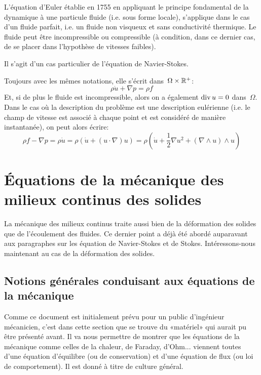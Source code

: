 L'équation d'Euler établie en 1755 en appliquant le principe fondamental de la dynamique à une particule fluide (i.e. sous forme locale), s'applique dans le cas d'un fluide parfait, i.e. un fluide non visqueux et sans conductivité thermique. Le fluide peut être incompressible ou compressible (à condition, dans ce dernier cas, de se placer dans l'hypothèse de vitesses faibles). 

Il s'agit d'un cas particulier de l'équation de Navier-Stokes.

\medskip
Toujours avec les mêmes notations, elle s'écrit dans~$\Omega\times\mathbb R^+$:
\begin{equation}
\rho \dot{u} + \nabla p = \rho f
\end{equation}
Et, si de plus le fluide est incompressible, alors on a également 
$\operatorname{div} u = 0$ dans~$\Omega$.
\medskipvm{}
Dans le cas où la description du problème est une description eulérienne (i.e. le champ de vitesse est associé à chaque point et est considéré de manière instantanée), on peut alors écrire:
\begin{equation}
  \rho f - \nabla p = \rho \dot{u} =
	\rho \left(\dot{u} + (u\cdot\nabla)u \right)=
	\rho \left( \dot{u} + \frac12 \nabla u^2 + (\nabla\wedge u)\wedge u \right)
\end{equation}
\medskipvm
{}

\medskip
\section{Équations de la mécanique des milieux continus des solides}
La mécanique des milieux continus traite aussi bien de la déformation des solides que de l'écoulement des fluides. Ce dernier point a déjà été abordé auparavant aux paragraphes sur les équation de Navier-Stokes et de Stokes. Intéressons-nous maintenant au cas de la déformation des solides.

\medskip{}
\subsection{Notions générales conduisant aux équations de la mécanique}
Comme ce document est initialement prévu pour un public d'ingénieur mécanicien, c'est dans cette section que se trouve du «matériel» qui aurait pu être présenté avant. Il va nous permettre de montrer que les équations de la mécanique comme celles de la chaleur, de Faraday, d'Ohm... viennent toutes d'une équation d'équilibre (ou de conservation) et d'une équation de flux (ou loi de comportement). Il est donné à titre de culture général.

